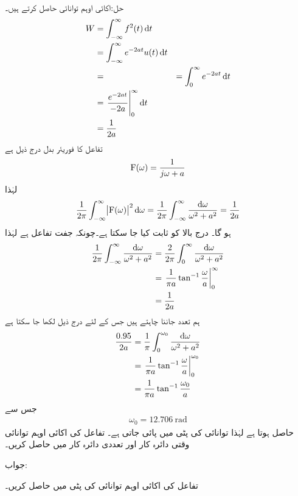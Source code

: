حل:اکائی اوہم توانائی حاصل کرتے ہیں۔
\begin{align*}
W&=\int_{-\infty}^{\infty} f^2(t)\dif t\\
&=\int_{-\infty}^{\infty} e^{-2at}u(t) \dif t\\
&=&=\int_{0}^{\infty} e^{-2at} \dif t\\
&=\left. \frac{e^{-2at}}{-2a}  \right|_{0}^{\infty}\dif t\\
&=\frac{1}{2a}
\end{align*}
تفاعل کا فوریئر بدل درج ذیل ہے
\begin{align*}
{\ensuremath{{\textup{F}}}}(\omega)=\frac{1}{j\omega+a}
\end{align*}
لہٰذا 
\begin{align*}
\frac{1}{2\pi}\int_{-\infty}^{\infty} \abs{\bF(\omega)}^2 \dif \omega=\frac{1}{2\pi}\int_{-\infty}^{\infty}\frac{\dif \omega}{\omega^2+a^2}  =\frac{1}{2a}
\end{align*}
ہو گا۔ درج بالا کو ثابت کیا جا سکتا ہے۔چونکہ  جفت تفاعل ہے لہٰذا
\begin{align*}
\frac{1}{2\pi}\int_{-\infty}^{\infty}\frac{\dif \omega}{\omega^2+a^2}&=\frac{2}{2\pi}\int_{0}^{\infty}\frac{\dif \omega}{\omega^2+a^2}\\
&=\left. \frac{1}{\pi a} \tan^{-1}\frac{\omega}{a}\right|_{0}^{\infty}\\
&=\frac{1}{2a}
\end{align*}
ہم تعدد  جاننا چاہتے ہیں جس کے لئے درج ذیل لکھا جا سکتا ہے
\begin{align*}
\frac{0.95}{2a}&=\frac{1}{\pi}\int_0^{\omega_0} \frac{\dif \omega}{\omega^2+a^2}\\
&=\left. \frac{1}{\pi a} \tan^{-1}\frac{\omega}{a} \right|_0^{\omega_0}\\
&=\frac{1}{\pi a} \tan^{-1} \frac{\omega_0}{a}
\end{align*}
جس سے
\begin{align*}
\omega_0=\SI{12.706}{\radian}
\end{align*}
حاصل ہوتا ہے لہٰذا  توانائی  کی پٹی میں پائی جاتی ہے۔ 
تفاعل  کی اکائی اوہم توانائی وقتی دائرہ کار اور تعددی دائرہ کار میں حاصل کریں۔

جواب:

تفاعل  کی اکائی اوہم توانائی  کی پٹی میں حاصل کریں۔

